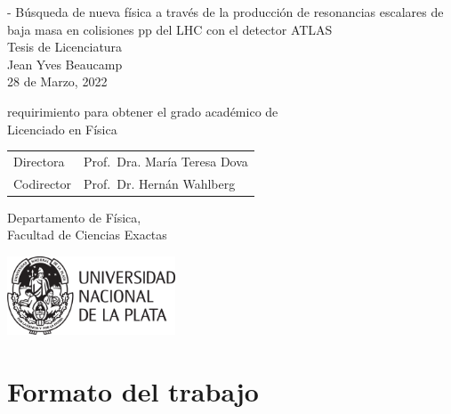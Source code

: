 \thispagestyle{empty}
{
    \calccentering{\unitlength}
    \begin{adjustwidth*}{\unitlength}{-\unitlength}
        \raggedleft{}
        {\Huge\color{Burgundy}%
        Búsqueda de nueva física a través de la producción de resonancias escalares de baja masa en colisiones pp del LHC con el detector ATLAS}\\[\baselineskip]
        {\LARGE%
        Tesis de Licenciatura}\\[0.2\textheight]
        {\huge%
        Jean Yves Beaucamp}\\[\baselineskip]
        {\LARGE%
        28 de Marzo, 2022}
        \vfill
        \vfill
        {\large%
        requirimiento para obtener el grado académico de\\
        Licenciado en Física\\[\baselineskip]
        \vfill
        \begin{tabularx}{0.695\textwidth}{ L{20mm} R{50mm} }
            Directora  & Prof.\ Dra. María Teresa Dova\\
            Codirector & Prof.\ Dr.\; Hernán Wahlberg
        \end{tabularx}
        \vfill
        Departamento de Física,\\
        Facultad de Ciencias Exactas\\[2\baselineskip]
        }
        {\includegraphics[width=5cm]{Assets/Images/UNLP.pdf}}
        \vspace{\baselineskip}
    \end{adjustwidth*}
}

\clearpage{}

\thispagestyle{empty}
\hphantom{.}
\vfill

\section*{\normalsize Formato del trabajo}

